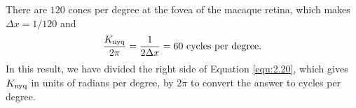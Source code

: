 \begin{exm}
  There are $120$ cones per degree at the fovea of the macaque retina, which makes $\Delta x = 1/120$ and
  \begin{displaymath}
    \frac{K_{\rm{nyq}}}{2\pi} = \frac{1}{2\Delta x} = 60 \ \rm{cycles\ per\ degree}.
  \end{displaymath}
  In this result, we have divided the right side of Equation \ref{equ:2.20}, which gives $K_{\rm{nyq}}$ in units of radians per degree, by $2\pi$ to convert the answer to cycles per degree.
\end{exm}





 



 
 




